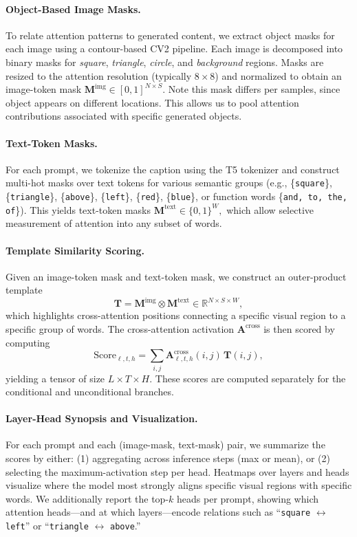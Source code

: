 \paragraph{Object-Based Image Masks.}
To relate attention patterns to generated content, we extract object masks for each image using a contour-based CV2 pipeline. Each image is decomposed into binary masks for \textit{square}, \textit{triangle}, \textit{circle}, and \textit{background} regions. Masks are resized to the attention resolution (typically $8 \times 8$) and normalized to obtain an image-token mask
$\mathbf{M}^{\text{img}} \in [0,1]^{N \times S}$. Note this mask differs per samples, since object appears on different locations. 
This allows us to pool attention contributions associated with specific generated objects.

\paragraph{Text-Token Masks.}
\begin{sloppypar}
For each prompt, we tokenize the caption using the T5 tokenizer and construct multi-hot masks over text tokens for various semantic groups (e.g., \{\texttt{square}\}, \{\texttt{triangle}\}, \{\texttt{above}\}, \{\texttt{left}\}, \{\texttt{red}\}, \{\texttt{blue}\}, or function words \{\texttt{and, to, the, of}\}). This yields text-token masks $\mathbf{M}^{\text{text}} \in \{0,1\}^{W},$
which allow selective measurement of attention into any subset of words.
\end{sloppypar}

\paragraph{Template Similarity Scoring.}
Given an image-token mask and text-token mask, we construct an outer-product template
\[
\mathbf{T} = \mathbf{M}^{\text{img}} \otimes \mathbf{M}^{\text{text}} \in \mathbb{R}^{N \times S \times W},
\]
which highlights cross-attention positions connecting a specific visual region to a specific group of words. The cross-attention activation $\mathbf{A}^{\text{cross}}$ is then scored by computing
\[
\mathrm{Score}_{\ell,t,h} = 
\sum_{i,j} 
\mathbf{A}^{\text{cross}}_{\ell,t,h}(i,j)\,\mathbf{T}(i,j),
\]
yielding a tensor of size $L \times T \times H$. These scores are computed separately for the conditional and unconditional branches.

\paragraph{Layer-Head Synopsis and Visualization.}
For each prompt and each (image-mask, text-mask) pair, we summarize the scores by either:
(1) aggregating across inference steps (max or mean), or 
(2) selecting the maximum-activation step per head. Heatmaps over layers and heads visualize where the model most strongly aligns specific visual regions with specific words. We additionally report the top-$k$ heads per prompt, showing which attention heads—and at which layers—encode relations such as “\texttt{square} $\leftrightarrow$ \texttt{left}” or “\texttt{triangle} $\leftrightarrow$ \texttt{above}.”

